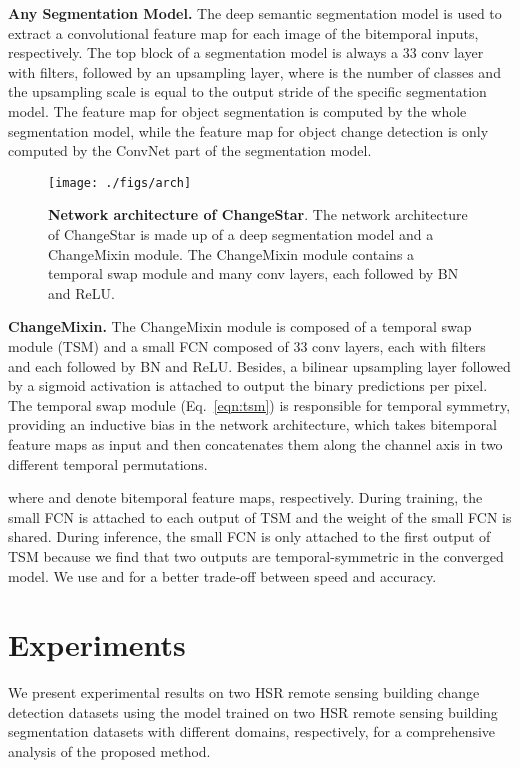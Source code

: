 \documentclass[10pt,twocolumn,letterpaper]{article}
\begin{document}
\noindent \textbf{Any Segmentation Model.}
The deep semantic segmentation model is used to extract a convolutional feature map for each image of the bitemporal inputs, respectively.
The top block of a segmentation model is always a 33 conv layer with  filters, followed by an upsampling layer, where  is the number of classes and the upsampling scale is equal to the output stride of the specific segmentation model.
The feature map for object segmentation is computed by the whole segmentation model, while the feature map for object change detection is only computed by the ConvNet part of the segmentation model.


\begin{figure}
  \centering
  \texttt{[image: ./figs/arch]}
  \caption{\textbf{Network architecture of ChangeStar}. 
  The network architecture of ChangeStar is made up of a deep segmentation model and a ChangeMixin module.
  The ChangeMixin module contains a temporal swap module and many conv layers, each followed by BN and ReLU.
  }
  \label{fig:arch}
\end{figure}

\noindent \textbf{ChangeMixin.}
The ChangeMixin module is composed of a temporal swap module (TSM) and a small FCN composed of  33 conv layers, each with  filters and each followed by BN and ReLU.
Besides, a bilinear upsampling layer followed by a sigmoid activation is attached to output the binary predictions per pixel.
The temporal swap module (Eq.~\ref{eqn:tsm}) is responsible for temporal symmetry, providing an inductive bias in the network architecture, which takes bitemporal feature maps as input and then concatenates them along the channel axis in two different temporal permutations.

where  and   denote bitemporal feature maps, respectively.
During training, the small FCN is attached to each output of TSM and the weight of the small FCN is shared.
During inference, the small FCN is only attached to the first output of TSM because we find that two outputs are temporal-symmetric in the converged model.
We use  and  for a better trade-off between speed and accuracy.


\section{Experiments}
\label{sec:exp}
We present experimental results on two HSR remote sensing building change detection datasets using the model trained on two HSR remote sensing building segmentation datasets with different domains, respectively, for a comprehensive analysis of the proposed method.
\end{document}
